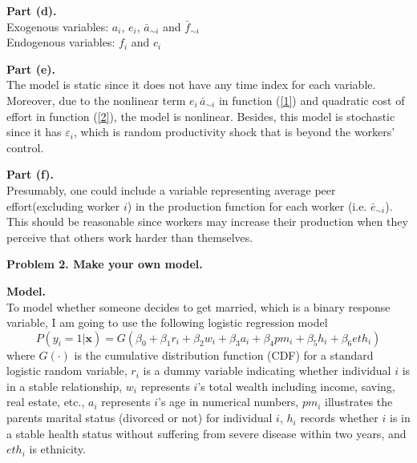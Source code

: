 \documentclass[letterpaper,12pt]{article}
\theoremstyle{definition}
\begin{document}
\noindent\textbf{Part (d).} \\
Exogenous variables: $a_i$, $e_i$, $\bar{a}_{\sim i}$ and $\bar{f}_{\sim i}$\\
Endogenous variables: $f_i$ and $c_i$ 
\vspace{1mm}

\noindent\textbf{Part (e).} \\
The model is static since it does not have any time index for each variable. Moreover, due to the nonlinear term $e_i\,\bar{a}_{\sim i}$ in function (\ref{1}) and quadratic cost of effort in function (\ref{2}), the model is nonlinear. Besides, this model is stochastic since it has $\varepsilon_i$, which is random productivity shock that is beyond the workers' control. 
\vspace{1mm}

\noindent\textbf{Part (f).} \\
Presumably, one could include a variable representing average peer effort(excluding worker $i$) in the production function for each worker (i.e. $\bar{e}_{\sim i}$). This should be reasonable since workers may increase their production when they perceive that others work harder than themselves. 


\newpage

\noindent\textbf{Problem 2. Make your own model.} 
\vspace{3mm}

\noindent\textbf{Model.} \\
To model whether someone decides to get married, which is a binary response variable, I am going to use the following logistic regression model
\begin{equation}
    P(y_i = 1|\textbf{x}) = G(\beta_0 + \beta_1r_i + \beta_2w_i + \beta_3a_i + \beta_4pm_i + \beta_5h_i + \beta_6eth_i)
\label{3}
\end{equation}
where $G(\cdot)$ is the cumulative distribution function (CDF) for a standard logistic random variable, $r_i$ is a dummy variable indicating whether individual $i$ is in a stable relationship, $w_i$ represents $i$'s total wealth including income, saving, real estate, etc., $a_i$ represents $i$'s age in numerical numbers, $pm_i$ illustrates the parents marital status (divorced or not) for individual $i$, $h_i$ records whether $i$ is in a stable health status without suffering from severe disease within two years, and $eth_i$ is ethnicity. \vspace{2mm}
\end{document}
